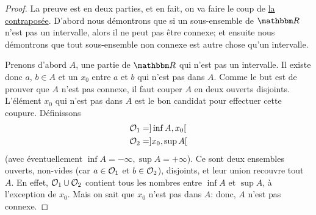 \begin{proof}
    La preuve est en deux parties, et en fait, on va faire le coup de \href{http://fr.wikipedia.org/wiki/Contraposée}{la contraposée}. D'abord nous démontrons que si un sous-ensemble de $\eR$ n'est pas un intervalle, alors il ne peut pas être connexe; et ensuite nous démontrons que tout sous-ensemble non connexe est autre chose qu'un intervalle.

    Prenons d'abord $A$, une partie de $\eR$ qui n'est pas un intervalle. Il existe donc $a$, $b\in A$ et un $x_0$ entre $a$ et $b$ qui n'est pas dans $A$. Comme le but est de prouver que $A$ n'est pas connexe, il faut couper $A$ en deux ouverts disjoints. L'élément $x_0$ qui n'est pas dans $A$ est le bon candidat pour effectuer cette coupure. Définissons
    \begin{align*}
        \mathcal{O}_1&=]\inf A ,x_0[\\
        \mathcal{O}_2&=]x_0, \sup A[
    \end{align*}
    (avec éventuellement \( \inf A = - \infty, \sup A = + \infty \)). Ce sont deux ensembles ouverts, non-vides (car \( a \in \mathcal{O}_1 \) et \( b \in \mathcal{O}_2 \)), disjoints, et leur union recouvre tout $A$. En effet, $\mathcal{O}_1\cup \mathcal{O}_2$ contient tous les nombres entre  $\inf A$ et $\sup A$, à l'exception de $x_0$. Mais on sait que $x_0$ n'est pas dans $A$: donc, $A$ n'est pas connexe.


\end{proof}
